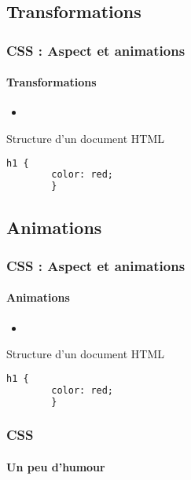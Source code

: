 \documentclass[xcolor=table]{beamer}
\begin{document}
\subsection{Transformations}

\begin{frame}[fragile]
\frametitle{CSS : Aspect et animations}
\framesubtitle{Transformations}

\begin{minipage}{0.60\textwidth}
	\begin{itemize}
		\item 
	\end{itemize}
\end{minipage}
%
\begin{minipage}{0.38\textwidth}
	\begin{block}{Structure d'un document HTML}
		\lstset{escapeinside=**}
		\scriptsize\bfseries
		\begin{lstlisting}[language={html}]
		h1 {
		color: red;
		}
		\end{lstlisting}
	\end{block}
\end{minipage}
\end{frame}

\subsection{Animations}

\begin{frame}[fragile]
\frametitle{CSS : Aspect et animations}
\framesubtitle{Animations}

\begin{minipage}{0.60\textwidth}
	\begin{itemize}
		\item 
	\end{itemize}
\end{minipage}
%
\begin{minipage}{0.38\textwidth}
	\begin{block}{Structure d'un document HTML}
		\lstset{escapeinside=**}
		\scriptsize\bfseries
		\begin{lstlisting}[language={html}]
		h1 {
		color: red;
		}
		\end{lstlisting}
	\end{block}
\end{minipage}
\end{frame}


\begin{frame}
\frametitle{CSS}
\framesubtitle{Un peu d'humour}

\begin{center}
\end{center}

\end{frame}

\end{document}
